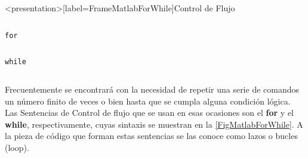 \begin{frame}<presentation>[label=FrameMatlabForWhile]{Control de Flujo}
  \begin{columns}
    \hfill


  \end{columns}

  \begin{columns}[T]
      \flushright \large\texttt{for}

      \begin{codeblock}
	
      \end{codeblock}

      \begin{codeblock}
	

      \end{codeblock}

  \end{columns}

  \begin{columns}[T]
    \flushright \large\texttt{while}

      \begin{codeblock}
	
      \end{codeblock}

      \begin{codeblock}
	
      \end{codeblock}

  \end{columns}
\end{frame}


Frecuentemente se encontrará con la necesidad de repetir una serie de 
comandos un número finito de veces o bien hasta que se cumpla alguna 
condición lógica. Las Sentencias de Control de flujo que se usan en esas 
ocasiones son el \textbf{for} y el \textbf{while}, respectivamente, 
cuyas sintaxis se muestran en la \autoref{FigMatlabForWhile}. A la pieza de
código que forman estas sentencias se las conoce como
lazos o bucles (loop).

